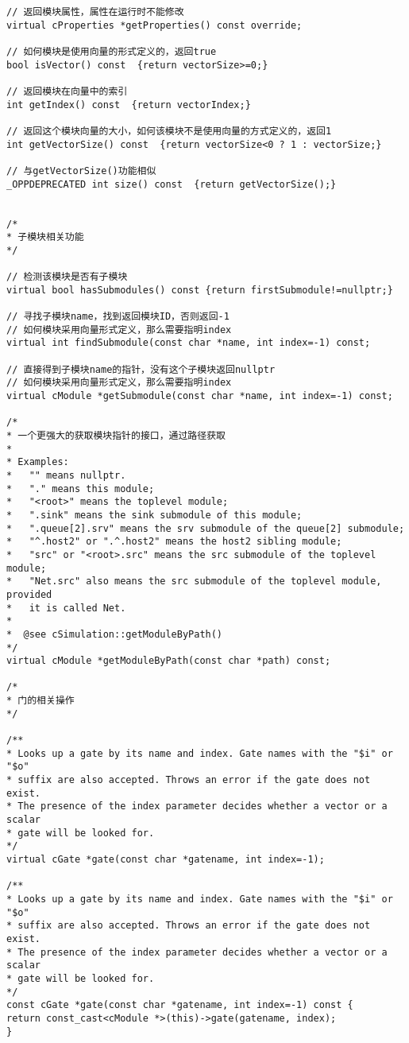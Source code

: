 \begin{lstlisting}
// 返回模块属性，属性在运行时不能修改
virtual cProperties *getProperties() const override;

// 如何模块是使用向量的形式定义的，返回true
bool isVector() const  {return vectorSize>=0;}

// 返回模块在向量中的索引
int getIndex() const  {return vectorIndex;}

// 返回这个模块向量的大小，如何该模块不是使用向量的方式定义的，返回1
int getVectorSize() const  {return vectorSize<0 ? 1 : vectorSize;}

// 与getVectorSize()功能相似
_OPPDEPRECATED int size() const  {return getVectorSize();}


/*
* 子模块相关功能
*/

// 检测该模块是否有子模块
virtual bool hasSubmodules() const {return firstSubmodule!=nullptr;}

// 寻找子模块name，找到返回模块ID，否则返回-1
// 如何模块采用向量形式定义，那么需要指明index
virtual int findSubmodule(const char *name, int index=-1) const;

// 直接得到子模块name的指针，没有这个子模块返回nullptr
// 如何模块采用向量形式定义，那么需要指明index
virtual cModule *getSubmodule(const char *name, int index=-1) const;

/*
* 一个更强大的获取模块指针的接口，通过路径获取
*
* Examples:
*   "" means nullptr.
*   "." means this module;
*   "<root>" means the toplevel module;
*   ".sink" means the sink submodule of this module;
*   ".queue[2].srv" means the srv submodule of the queue[2] submodule;
*   "^.host2" or ".^.host2" means the host2 sibling module;
*   "src" or "<root>.src" means the src submodule of the toplevel module;
*   "Net.src" also means the src submodule of the toplevel module, provided
*   it is called Net.
*
*  @see cSimulation::getModuleByPath()
*/
virtual cModule *getModuleByPath(const char *path) const;

/*
* 门的相关操作
*/

/**
* Looks up a gate by its name and index. Gate names with the "$i" or "$o"
* suffix are also accepted. Throws an error if the gate does not exist.
* The presence of the index parameter decides whether a vector or a scalar
* gate will be looked for.
*/
virtual cGate *gate(const char *gatename, int index=-1);

/**
* Looks up a gate by its name and index. Gate names with the "$i" or "$o"
* suffix are also accepted. Throws an error if the gate does not exist.
* The presence of the index parameter decides whether a vector or a scalar
* gate will be looked for.
*/
const cGate *gate(const char *gatename, int index=-1) const {
return const_cast<cModule *>(this)->gate(gatename, index);
}



\end{lstlisting}
